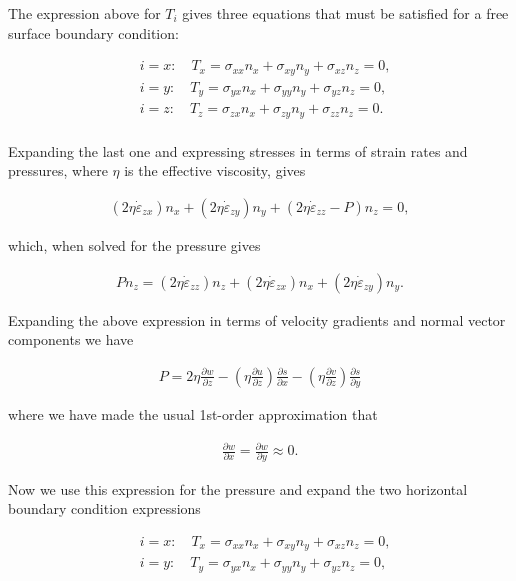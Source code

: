 The expression above for $T_i$ gives three equations that must be satisfied for a free surface boundary condition:

\begin{align*}
  & i=x:\quad T_{x}=\sigma _{xx}n_{x}+\sigma _{xy}n_{y}+\sigma _{xz}n_{z}=0, \\ 
 & i=y:\quad T_{y}=\sigma _{yx}n_{x}+\sigma _{yy}n_{y}+\sigma _{yz}n_{z}=0, \\ 
 & i=z:\quad T_{z}=\sigma _{zx}n_{x}+\sigma _{zy}n_{y}+\sigma _{zz}n_{z}=0. \\ 
\end{align*}

Expanding the last one and expressing stresses in terms of strain rates and pressures, where $\eta$ is the effective viscosity, gives

\begin{align*}
\left( 2\eta \dot{\varepsilon }_{zx} \right)n_{x}+\left( 2\eta \dot{\varepsilon }_{zy} \right)n_{y}+\left( 2\eta \dot{\varepsilon }_{zz}-P \right)n_{z}=0,
\end{align*}

which, when solved for the pressure gives

\begin{align*}
Pn_{z}=\left( 2\eta \dot{\varepsilon }_{zz} \right)n_{z}+\left( 2\eta \dot{\varepsilon }_{zx} \right)n_{x}+\left( 2\eta \dot{\varepsilon }_{zy} \right)n_{y}.
\end{align*}


Expanding the above expression in terms of velocity gradients and normal vector components we have

\begin{align*}
P=2\eta \frac{\partial w}{\partial z}-\left( \eta \frac{\partial u}{\partial z} \right)\frac{\partial s}{\partial x}-\left( \eta \frac{\partial v}{\partial z} \right)\frac{\partial s}{\partial y}
\end{align*}

where we have made the usual 1st-order approximation that 

\begin{align*}
\frac{\partial w}{\partial x}=\frac{\partial w}{\partial y}\approx 0.
\end{align*}

Now we use this expression for the pressure and expand the two horizontal boundary condition expressions

\begin{align*}
  & i=x:\quad T_{x}=\sigma _{xx}n_{x}+\sigma _{xy}n_{y}+\sigma _{xz}n_{z}=0, \\ 
 & i=y:\quad T_{y}=\sigma _{yx}n_{x}+\sigma _{yy}n_{y}+\sigma _{yz}n_{z}=0, \\
 \end{align*}

